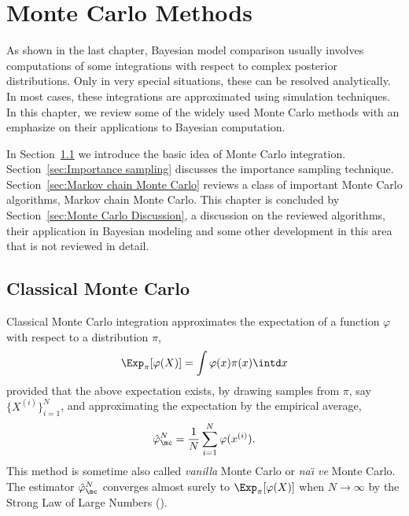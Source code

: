 \chapter{Monte Carlo Methods}
\label{cha:Monte Carlo Methods}

As shown in the last chapter, Bayesian model comparison usually involves
computations of some integrations with respect to complex posterior
distributions. Only in very special situations, these can be resolved
analytically. In most cases, these integrations are approximated using
simulation techniques. In this chapter, we review some of the widely used
Monte Carlo methods with an emphasize on their applications to Bayesian
computation.

In Section~\ref{sec:Classical Monte Carlo} we introduce the basic idea of
Monte Carlo integration. Section~\ref{sec:Importance sampling} discusses the
importance sampling technique. Section~\ref{sec:Markov chain Monte Carlo}
reviews a class of important Monte Carlo algorithms, Markov chain Monte Carlo.
This chapter is concluded by Section~\ref{sec:Monte Carlo Discussion}, a
discussion on the reviewed algorithms, their application in Bayesian modeling
and some other development in this area that is not reviewed in detail.

\section{Classical Monte Carlo}
\label{sec:Classical Monte Carlo}

Classical Monte Carlo integration approximates the expectation of a function
$\varphi$ with respect to a distribution $\pi$,
\begin{equation}
  \Exp_{\pi}[\varphi(X)] = \int\varphi(x)\pi(x)\intd x
\end{equation}
provided that the above expectation exists, by drawing \iid samples from
$\pi$, say $\{X^{(i)}\}_{i=1}^N$, and approximating the expectation by the
empirical average,
\begin{equation}
  \hat\varphi_{\mc}^N = \frac{1}{N}\sum_{i=1}^N\varphi(x^{(i)}).
  \label{eq:vanilla mc}
\end{equation}
This method is sometime also called \emph{vanilla} Monte Carlo or \emph{na\"\i
  ve} Monte Carlo. The estimator $\hat\varphi_{\mc}^N$ converges almost surely
to $\Exp_{\pi}[\varphi(X)]$ when $N\to\infty$ by the Strong Law of Large
Numbers (\slln).

